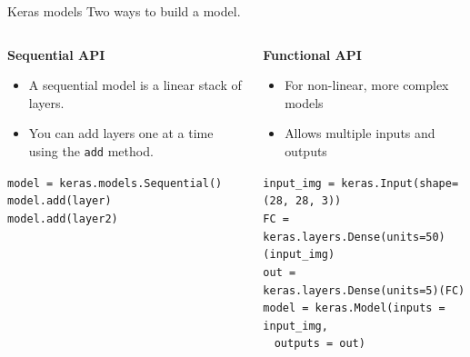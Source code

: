 \documentclass[9pt, aspectratio=169]{beamer}
\begin{document}
\begin{frame}
    {Keras models}
    Two ways to build a model.
    \vspace{2em}

    \begin{columns}[t]
        \begin{column}{.45\textwidth}
            \textbf{Sequential API}
            \begin{itemize}
                \item A sequential model is a linear stack of layers.
                \item You can add layers one at a time using the \texttt{add} method.
            \end{itemize}

            \vspace{1em}
            \begin{codebox}
                \texttt{model = keras.models.Sequential()\\
                    model.add(layer)\\
                    model.add(layer2)}
            \end{codebox}
        \end{column}

        \begin{column}{.55\textwidth}
            \textbf{Functional API}
            \begin{itemize}
                \item For non-linear, more complex models
                \item Allows multiple inputs and outputs
            \end{itemize}

            \vspace{1em}
            \begin{codebox}
                \texttt{input\_img = keras.Input(shape=(28, 28, 3))\\
                    FC = keras.layers.Dense(units=50)(input\_img)\\
                    out = keras.layers.Dense(units=5)(FC)\\
                    model = keras.Model(inputs = input\_img,\\ $~~~~$outputs = out)
                }
            \end{codebox}
        \end{column}
    \end{columns}
\end{frame}
\end{document}
